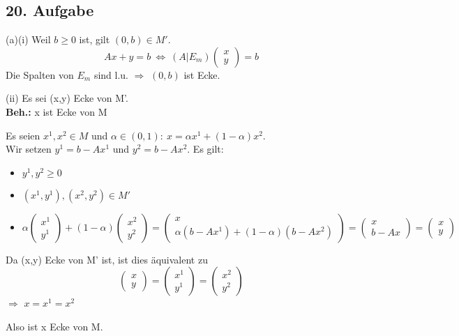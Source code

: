 \documentclass[a4paper,11pt,twoside,titlepage]{article}
\begin{document}
\subsection*{20. Aufgabe}
(a)(i) Weil $b\geq0$ ist, gilt $(0,b)\in M'$.
\[Ax+y=b\ \Leftrightarrow\ (A|E_m)\begin{pmatrix}x\\y\end{pmatrix}=b\]
Die Spalten von $E_m$ sind l.u. $\Rightarrow$ $(0,b)$ ist Ecke.

(ii) Es sei (x,y) Ecke von M'.\\
\textbf{Beh.:} x ist Ecke von M

Es seien $x^1,x^2\in M$ und $\alpha\in(0,1):\ x=\alpha x^1+(1-\alpha)x^2$.\\
Wir setzen $y^1=b-Ax^1$ und $y^2=b-Ax^2$. Es gilt:
\begin{itemize}
\item{$y^1,y^2\geq0$}
\item{$(x^1,y^1),(x^2,y^2)\in M'$}
\item{$$\alpha\begin{pmatrix}x^1\\y^1\end{pmatrix}+(1-\alpha)\begin{pmatrix}x^2\\y^2\end{pmatrix}=\begin{pmatrix}x\\\alpha(b-Ax^1)+(1-\alpha)(b-Ax^2)\end{pmatrix}=\begin{pmatrix}x\\b-Ax\end{pmatrix}=\begin{pmatrix}x\\y\end{pmatrix}$$}
\end{itemize}

Da (x,y) Ecke von M' ist, ist dies äquivalent zu
\[\begin{pmatrix}x\\y\end{pmatrix}=\begin{pmatrix}x^1\\y^1\end{pmatrix}=\begin{pmatrix}x^2\\y^2\end{pmatrix}\]
$\Rightarrow$ $x=x^1=x^2$

Also ist x Ecke von M.
\end{document}
